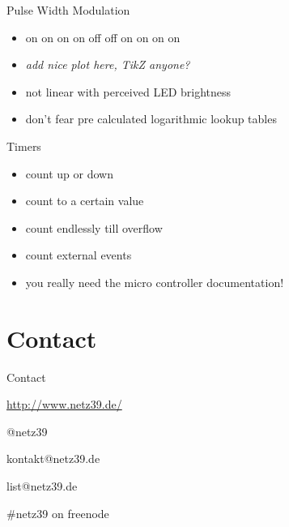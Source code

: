 \documentclass{beamer}
\begin{document}
\begin{frame}{Pulse Width Modulation}
    \begin{itemize}
        \item on on on on off off on on on on
        \pause
        \item \emph{add nice plot here, TikZ anyone?}
        \pause
        \item not linear with perceived LED brightness
        \item don't fear pre calculated logarithmic lookup tables
    \end{itemize}
\end{frame}

\begin{frame}{Timers}
    \begin{itemize}
        \item count up or down
        \item count to a certain value
        \item count endlessly till overflow
        \item count external events
        \pause
        \item you really need the micro controller documentation!
    \end{itemize}
\end{frame}



\section{Contact}

\begin{frame}{Contact}
    \begin{center}
        \begin{description}
            \item[WWW] \url{http://www.netz39.de/}
            \item[Twitter/identi.ca] @netz39
            \item[E-Mail] kontakt@netz39.de
            \item[Mailingliste] list@netz39.de
            \item[IRC] \#netz39 on freenode
        \end{description}
    \end{center}
\end{frame}
\end{document}
